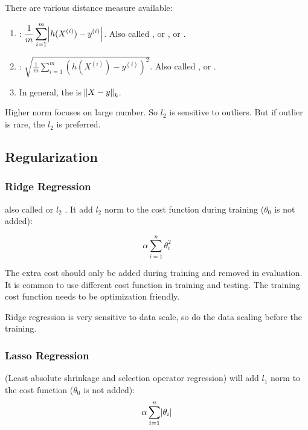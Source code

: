 There are various distance measure available:
\begin{enumerate}
    \item {}: $\displaystyle \frac{1}{m} \sum_{i=1}^m \abs{h(X^{(i)}) - y^{(i)}}$. Also called , or , or .
    \item {}: $\displaystyle \sqrt{\frac{1}{m} \sum_{i=1}^m \left(h(X^{(i)}) - y^{(i)} \right)^2}$. Also called , or .
    \item In general, the  is $\norm{X - y}_k$.
\end{enumerate}

Higher norm focuses on large number. So $l_2$ is sensitive to outliers. But if outlier is rare, the $l_2$ is preferred.






\subsection{Regularization}

\subsubsection{Ridge Regression}

 also called  or $l_2$ . It add $l_2$ norm to the cost function during training ($\theta_0$ is not added):

\begin{equation}
	\alpha \sum_{i=1}^n \theta_i^2
\end{equation}


The extra cost should only be added during training and removed in evaluation. It is common to use different cost function in training and testing. The training cost function needs to be optimization friendly. 

Ridge regression is very sensitive to data scale, so do the data scaling before the training. 




\subsubsection{Lasso Regression}
 (Least absolute shrinkage and selection operator regression) will add $l_1$ norm to the cost function ($\theta_0$ is not added):
\begin{equation}
	\alpha \sum_{i=1}^n \abs{\theta_i}
\end{equation}

